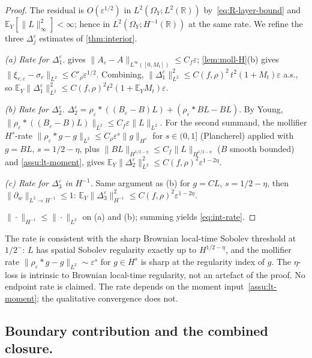 \documentclass[EJP]{ejpecp}
\newcommand{\R}{\mathbb{R}}
\renewcommand{\E}{\mathbb{E}}
\begin{document}
\begin{proof}
The residual is $O(\varepsilon^{1/2})$ in $L^{2}(\Omega_Y;L^{2}(\R))$
by~\eqref{eq:R-layer-bound} and $\E_Y[\|L\|_\infty^{2}]<\infty$;
hence in $L^{2}(\Omega_Y;H^{-1}(\R))$ at the same rate. We refine the
three $\Delta_j^{\varepsilon}$ estimates of \cref{thm:interior}.

\emph{(a) Rate for $\Delta_1^{\varepsilon}$.}
 gives $\|A_\varepsilon-A\|_{L^{\infty}([0,M_t])}\le C_f\varepsilon$;
\cref{lem:moll-H}(b) gives
$\|\xi_{r,\varepsilon}-\sigma_r\|_{L^{2}}\le C'_\rho\varepsilon^{1/2}$.
Combining,
$\|\Delta_1^{\varepsilon}\|_{L^{2}}^{2}\le C(f,\rho)^{2}\,t^{2}(1+M_t)\varepsilon$
a.s., so $\E_Y\|\Delta_1^{\varepsilon}\|_{L^{2}}^{2}\le C(f,\rho)^{2}t^{2}(1+\E_Y M_t)\varepsilon$.

\emph{(b) Rate for $\Delta_2^{\varepsilon}$.}
$\Delta_2^{\varepsilon}=\rho_\varepsilon*((B_\varepsilon-B)L)+(\rho_\varepsilon*BL-BL)$.
By Young, $\|\rho_\varepsilon*((B_\varepsilon-B)L)\|_{L^{2}}\le C_f\varepsilon\|L\|_{L^{2}}$.
For the second summand, the mollifier $H^{s}$-rate
$\|\rho_\varepsilon*g-g\|_{L^{2}}\le C_\rho\varepsilon^{s}\|g\|_{H^{s}}$
for $s\in(0,1]$ (Plancherel) applied with $g=BL$, $s=1/2-\eta$, plus
$\|BL\|_{H^{1/2-\eta}}\le C_f\|L\|_{H^{1/2-\eta}}$ ($B$ smooth
bounded) and \cref{assu:lt-moment}, gives
$\E_Y\|\Delta_2^{\varepsilon}\|_{L^{2}}^{2}\le C(f,\rho)^{2}\varepsilon^{1-2\eta}$.

\emph{(c) Rate for $\Delta_3^{\varepsilon}$ in $H^{-1}$.}
Same argument as (b) for $g=CL$, $s=1/2-\eta$, then
$\|\partial_w\|_{L^{2}\to H^{-1}}\le 1$:
$\E_Y\|\Delta_3^{\varepsilon}\|_{H^{-1}}^{2}\le C(f,\rho)^{2}\varepsilon^{1-2\eta}$.

$\|\cdot\|_{H^{-1}}\le\|\cdot\|_{L^{2}}$ on (a) and (b); summing
yields \eqref{eq:int-rate}.
\end{proof}

The rate is consistent with the sharp Brownian local-time Sobolev
threshold at $1/2^{-}$: $L$ has spatial Sobolev regularity exactly
up to $H^{1/2-\eta}$, and the mollifier rate
$\|\rho_\varepsilon*g-g\|_{L^{2}}\sim\varepsilon^{s}$ for
$g\in H^{s}$ is sharp at the regularity index of $g$. The
$\eta$-loss is intrinsic to Brownian local-time regularity, not an
artefact of the proof. No endpoint rate is claimed. The rate depends
on the moment input~\cref{assu:lt-moment}; the qualitative
convergence does not.

\subsection*{Boundary contribution and the combined closure.}
\end{document}
